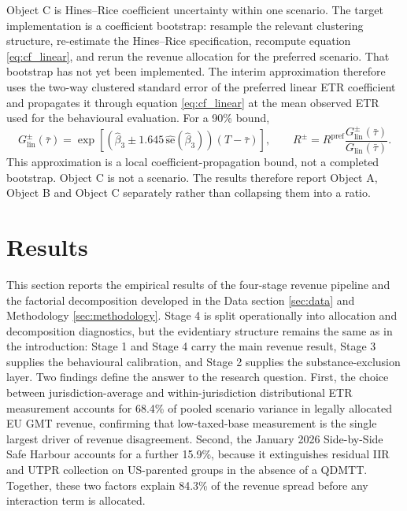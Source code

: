 \documentclass[11pt,a4paper]{article}
\begin{document}
Object C is Hines--Rice coefficient uncertainty within one scenario. The target implementation is a coefficient bootstrap: resample the relevant clustering structure, re-estimate the Hines--Rice specification, recompute equation \eqref{eq:cf_linear}, and rerun the revenue allocation for the preferred scenario. That bootstrap has not yet been implemented. The interim approximation therefore uses the two-way clustered standard error of the preferred linear ETR coefficient and propagates it through equation \eqref{eq:cf_linear} at the mean observed ETR used for the behavioural evaluation. For a 90\% bound,
\begin{equation}\label{eq:object_c_approx}
G_{\text{lin}}^{\pm}(\bar{\tau})
=
\exp\!\left[
\left(\hat{\beta}_3 \pm 1.645\,\widehat{\text{se}}(\hat{\beta}_3)\right)
(T-\bar{\tau})
\right],
\qquad
R^{\pm}
=
R^{\text{pref}}\frac{G_{\text{lin}}^{\pm}(\bar{\tau})}{G_{\text{lin}}(\bar{\tau})}.
\end{equation}
This approximation is a local coefficient-propagation bound, not a completed bootstrap. Object C is not a scenario. The results therefore report Object A, Object B and Object C separately rather than collapsing them into a ratio.

\newpage

\section{Results}\label{sec:results}\label{sec:se_results}

This section reports the empirical results of the four-stage revenue pipeline and the factorial decomposition developed in the Data section \ref{sec:data} and Methodology \ref{sec:methodology}. Stage 4 is split operationally into allocation and decomposition diagnostics, but the evidentiary structure remains the same as in the introduction: Stage 1 and Stage 4 carry the main revenue result, Stage 3 supplies the behavioural calibration, and Stage 2 supplies the substance-exclusion layer. Two findings define the answer to the research question. First, the choice between jurisdiction-average and within-jurisdiction distributional ETR measurement accounts for 68.4\% of pooled scenario variance in legally allocated EU GMT revenue, confirming that low-taxed-base measurement is the single largest driver of revenue disagreement. Second, the January 2026 Side-by-Side Safe Harbour accounts for a further 15.9\%, because it extinguishes residual IIR and UTPR collection on US-parented groups in the absence of a QDMTT. Together, these two factors explain 84.3\% of the revenue spread before any interaction term is allocated.
\end{document}
